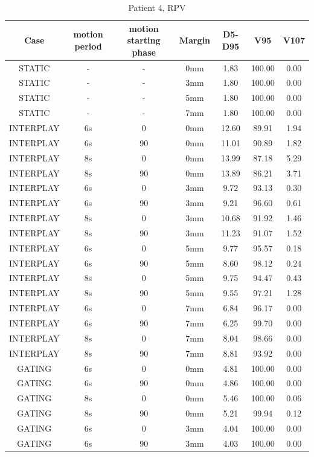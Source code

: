 \documentclass[type=dr, dr=rernat, accentcolor=tud7b,colorbacktitle, bigchapter, openright, twoside, 12pt ]{tudthesis}
\begin{document}
\begin{table}[H]
  \centering
  \caption{Patient 4, RPV}
  \begin{tabular}{|c||c|c|c||c|c|c|}
    \hline\hline
    Case & motion period & motion starting phase & Margin & D5-D95 & V95 & V107\\
    \hline 
STATIC & - & - & 0mm & 1.83 & 100.00 & 0.00 \\
STATIC & - & - & 3mm & 1.80 & 100.00 & 0.00 \\
STATIC & - & - & 5mm & 1.80 & 100.00 & 0.00 \\
STATIC & - & - & 7mm & 1.80 & 100.00 & 0.00 \\
INTERPLAY & 6s & 0 & 0mm & 12.60 & 89.91 & 1.94 \\
INTERPLAY & 6s & 90 & 0mm & 11.01 & 90.89 & 1.82 \\
INTERPLAY & 8s & 0 & 0mm & 13.99 & 87.18 & 5.29 \\
INTERPLAY & 8s & 90 & 0mm & 13.89 & 86.21 & 3.71 \\
INTERPLAY & 6s & 0 & 3mm & 9.72 & 93.13 & 0.30 \\
INTERPLAY & 6s & 90 & 3mm & 9.21 & 96.60 & 0.61 \\
INTERPLAY & 8s & 0 & 3mm & 10.68 & 91.92 & 1.46 \\
INTERPLAY & 8s & 90 & 3mm & 11.23 & 91.07 & 1.52 \\
INTERPLAY & 6s & 0 & 5mm & 9.77 & 95.57 & 0.18 \\
INTERPLAY & 6s & 90 & 5mm & 8.60 & 98.12 & 0.24 \\
INTERPLAY & 8s & 0 & 5mm & 9.75 & 94.47 & 0.43 \\
INTERPLAY & 8s & 90 & 5mm & 9.55 & 97.21 & 1.28 \\
INTERPLAY & 6s & 0 & 7mm & 6.84 & 96.17 & 0.00 \\
INTERPLAY & 6s & 90 & 7mm & 6.25 & 99.70 & 0.00 \\
INTERPLAY & 8s & 0 & 7mm & 8.04 & 98.66 & 0.00 \\
INTERPLAY & 8s & 90 & 7mm & 8.81 & 93.92 & 0.00 \\
GATING & 6s & 0 & 0mm & 4.81 & 100.00 & 0.00 \\
GATING & 6s & 90 & 0mm & 4.86 & 100.00 & 0.00 \\
GATING & 8s & 0 & 0mm & 5.46 & 100.00 & 0.06 \\
GATING & 8s & 90 & 0mm & 5.21 & 99.94 & 0.12 \\
GATING & 6s & 0 & 3mm & 4.04 & 100.00 & 0.00 \\
GATING & 6s & 90 & 3mm & 4.03 & 100.00 & 0.00 \\

\end{tabular}
\end{table}
\end{document}
